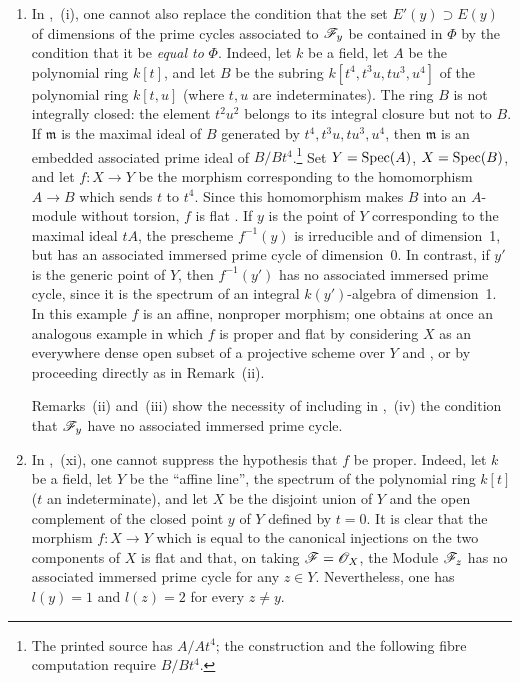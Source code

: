 \begin{remarks}[12.2.3]
\begin{enumerate}[label=(\roman*)]
  \item In ,~(i), one cannot also replace the condition that the set $E'(y)\supset E(y)$ of dimensions of the prime cycles associated to $\mathscr{F}_y$ be contained in $\Phi$ by the condition that it be \emph{equal to} $\Phi$.
Indeed, let $k$ be a field, let $A$ be the polynomial ring $k[t]$, and let $B$ be the subring $k[t^4,t^3u,tu^3,u^4]$ of the polynomial ring $k[t,u]$ (where $t,u$ are indeterminates). The ring $B$ is not integrally closed: the element $t^2u^2$ belongs to its integral closure but not to $B$. If $\mathfrak{m}$ is the maximal ideal of $B$ generated by $t^4,t^3u,tu^3,u^4$, then $\mathfrak{m}$ is an embedded associated prime ideal of $B/Bt^4$.\footnote{The printed source has $A/At^4$; the construction and the following fibre computation require $B/Bt^4$.}
Set $Y=\operatorname{Spec}(A)$, $X=\operatorname{Spec}(B)$, and let $f:X\to Y$ be the morphism corresponding to the homomorphism $A\to B$ which sends $t$ to $t^4$.
Since this homomorphism makes $B$ into an $A$-module without torsion, $f$ is flat .
If $y$ is the point of $Y$ corresponding to the maximal ideal $tA$, the prescheme $f^{-1}(y)$ is irreducible and of dimension~1, but has an associated immersed prime cycle of dimension~0. In contrast, if $y'$ is the generic point of $Y$, then $f^{-1}(y')$ has no associated immersed prime cycle, since it is the spectrum of an integral $k(y')$-algebra of dimension~1. In this example $f$ is an affine, nonproper morphism; one obtains at once an analogous example in which $f$ is proper and flat by considering $X$ as an everywhere dense open subset of a projective scheme over $Y$  and , or by proceeding directly as in Remark~(ii).

Remarks~(ii) and~(iii) show the necessity of including in ,~(iv) the condition that $\mathscr{F}_y$ have no associated immersed prime cycle.

  \item In ,~(xi), one cannot suppress the hypothesis that $f$ be proper.
Indeed, let $k$ be a field, let $Y$ be the ``affine line'', the spectrum of the polynomial ring $k[t]$ ($t$ an indeterminate), and let $X$ be the disjoint union of $Y$ and the open complement of the closed point $y$ of $Y$ defined by $t=0$. It is clear that the morphism $f:X\to Y$ which is equal to the canonical injections on the two components of $X$ is flat and that, on taking $\mathscr{F}=\mathscr{O}_X$, the Module $\mathscr{F}_z$ has no associated immersed prime cycle for any $z\in Y$. Nevertheless, one has $l(y)=1$ and $l(z)=2$ for every $z\neq y$.


\end{enumerate}
\end{remarks}
